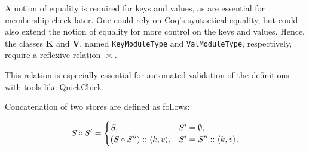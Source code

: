 A notion of equality is required for keys and values, as are essential for membership check later. One could rely on Coq's syntactical equality, but could also extend the notion of equality for more control on the keys and values. Hence, the classes $\mathbf{K}$ and $\mathbf{V}$, named \texttt{KeyModuleType} and \texttt{ValModuleType}, respectively, require a reflexive relation $\asymp$.

This relation is especially essential for automated validation of the definitions with tools like QuickChick.








\begin{definition}
Concatenation of two stores are defined as follows:

\begin{equation*}
S \circ S' =
\begin{cases}
    S, & S' = \emptyset, \\
    (S \circ S'') :: \langle k, v \rangle, & S' = S'' :: \langle k, v \rangle.
\end{cases}
\end{equation*}
\end{definition}

